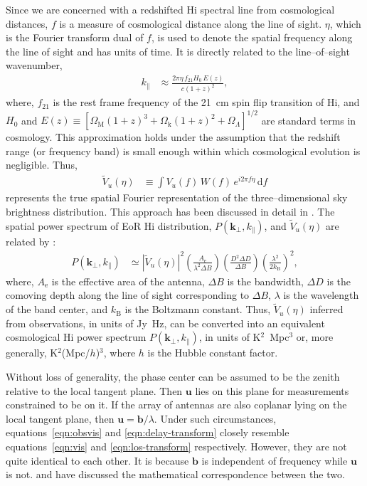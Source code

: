 \documentclass[preprint2,iop,numberedappendix,twocolappendix,appendixfloats]{emulateapj}
\newcommand{\dif}{\mathrm{d}}
\begin{document}
Since we are concerned with a redshifted H{\sc i} spectral line from cosmological distances, $f$ is a measure of cosmological distance along the line of sight. $\eta$, which is the Fourier transform dual of $f$, is used to denote the spatial frequency along the line of sight and has units of time. It is directly related to the line--of--sight wavenumber, 
\begin{align}\label{eqn:k-prll}
  k_\parallel &\approx \frac{2\pi\eta\,f_{21}H_0\,E(z)}{c(1+z)^2}, 
\end{align}
where, $f_{21}$ is the rest frame frequency of the 21~cm spin flip transition of H{\sc i}, and $H_0$ and $E(z)\equiv [\Omega_\textrm{M}(1+z)^3+\Omega_\textrm{k}(1+z)^2+\Omega_\Lambda]^{1/2}$ are standard terms in cosmology. This approximation holds under the assumption that the redshift range (or frequency band) is small enough within which cosmological evolution is negligible. Thus,
\begin{align}\label{eqn:los-transform}
  \tilde{V}_u(\eta) &\equiv \int V_u(f)\,W(f)\,e^{i2\pi f\eta}\,\dif f
\end{align}
represents the true spatial Fourier representation of the three--dimensional sky brightness distribution. This approach has been discussed in detail in \citet{mor04}. The spatial power spectrum of EoR H{\sc i} distribution, $P(\boldsymbol{k}_\perp,k_\parallel)$, and $\tilde{V}_u(\eta)$ are related by \citep{mor04,mcq06,par12a}: 
\begin{align}\label{eqn:true-power_spectrum}
  P(\boldsymbol{k}_\perp,k_\parallel) &\simeq |\tilde{V}_u(\eta)|^2\left(\frac{A_\textrm{e}}{\lambda^2\Delta B}\right)\left(\frac{D^2\Delta D}{\Delta B}\right)\left(\frac{\lambda^2}{2k_\textrm{B}}\right)^2,
\end{align}
where, $A_\textrm{e}$ is the effective area of the antenna, $\Delta B$ is the bandwidth, $\Delta D$ is the comoving depth along the line of sight corresponding to $\Delta B$, $\lambda$ is the wavelength of the band center, and $k_\textrm{B}$ is the Boltzmann constant. Thus, $\tilde{V}_u(\eta)$ inferred from observations, in units of Jy~Hz, can be converted into an equivalent cosmological H{\sc i} power spectrum $P(\boldsymbol{k}_\perp,k_\parallel)$, in units of K$^2$~Mpc$^3$ or, more generally, K$^2$(Mpc/$h$)$^3$, where $h$ is the Hubble constant factor.

Without loss of generality, the phase center can be assumed to be the zenith relative to the local tangent plane. Then $\boldsymbol{u}$ lies on this plane for measurements constrained to be on it. If the array of antennas are also coplanar lying on the local tangent plane, then $\boldsymbol{u}=\boldsymbol{b}/\lambda$. Under such circumstances, equations~\ref{eqn:obsvis} and \ref{eqn:delay-transform} closely resemble equations~\ref{eqn:vis} and \ref{eqn:los-transform} respectively. However, they are not quite identical to each other. It is because $\boldsymbol{b}$ is independent of frequency while $\boldsymbol{u}$ is not. \citet{par12b} and \citet{liu14a} have discussed the mathematical correspondence between the two. 



\end{document}
